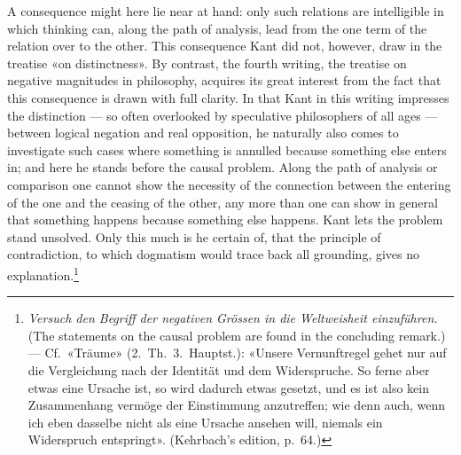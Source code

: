\documentclass[12pt,a4paper]{article}
\newcommand{\opage}[1]{\marginnote{\footnotesize\textit{[#1]}}}
\begin{document}
A consequence might here lie near at hand: only such relations are
intelligible in which thinking can, along the path of analysis, lead from
the one term of the relation over to the other. This consequence Kant did
not, however, draw in the treatise «on distinctness». By contrast, the
fourth writing, the treatise on negative magnitudes in philosophy,
acquires its great interest from the fact that this consequence is drawn
with full clarity. In that Kant in this writing \opage{20}impresses the distinction
--- so often overlooked by speculative philosophers of all ages ---
between logical negation and real opposition, he naturally also comes to
investigate such cases where something is annulled because something else
enters in; and here he stands before the causal problem. Along the path of
analysis or comparison one cannot show the necessity of the connection
between the entering of the one and the ceasing of the other, any more than
one can show in general that something happens because something else
happens. Kant lets the problem stand unsolved. Only this much is he
certain of, that the principle of contradiction, to which dogmatism would
trace back all grounding, gives no explanation.\footnote{\textit{Versuch
den Begriff der negativen Grössen in die Weltweisheit einzuführen.} (The
statements on the causal problem are found in the concluding remark.) ---
Cf.\ «Träume» (2.\ Th.\ 3.\ Hauptst.): «Unsere Vernunftregel gehet nur auf
die Vergleichung nach der Identität und dem Widerspruche. So ferne aber
etwas eine Ursache ist, so wird dadurch etwas gesetzt, und es ist also
kein Zusammenhang vermöge der Einstimmung anzutreffen; wie denn auch, wenn
ich eben dasselbe nicht als eine Ursache ansehen will, niemals ein
Widerspruch entspringt». (Kehrbach's edition, p.\ 64.)}
\end{document}
